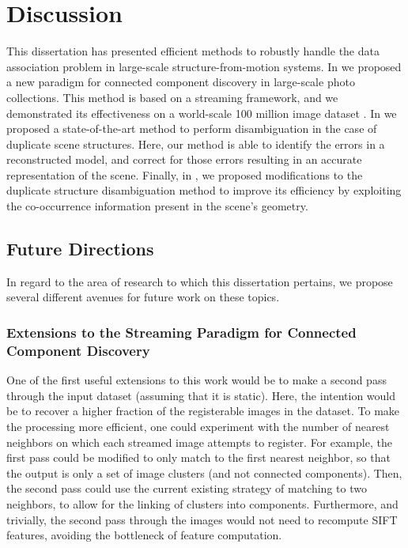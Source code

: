 \chapter{Discussion}
\label{ch:discussion}

This dissertation has presented efficient methods to robustly handle the data association problem in large-scale structure-from-motion systems.
In  we proposed a new paradigm for connected component discovery in large-scale photo collections.
This method is based on a streaming framework, and we demonstrated its effectiveness on a world-scale 100 million image dataset \cite{yahoo_100m, thomee2015_data_challenges}.
In  we proposed a state-of-the-art method to perform disambiguation in the case of duplicate scene structures.
Here, our method is able to identify the errors in a reconstructed model, and correct for those errors resulting in an accurate representation of the scene.
Finally, in , we proposed modifications to the duplicate structure disambiguation method to improve its efficiency by exploiting the co-occurrence information present in the scene's geometry.

\section{Future Directions}

In regard to the area of research to which this dissertation pertains, we propose several different avenues for future work on these topics.

\subsection[Extensions to the Streaming Paradigm for Connected Component Discovery]{Extensions to the Streaming Paradigm for Connected Component Discovery}
\label{sec:streaming_extensions}

One of the first useful extensions to this work would be to make a second pass through the input dataset (assuming that it is static).
Here, the intention would be to recover a higher fraction of the registerable images in the dataset.
To make the processing more efficient, one could experiment with the number of nearest neighbors on which each streamed image attempts to register.
For example, the first pass could be modified to only match to the first nearest neighbor, so that the output is only a set of image clusters (and not connected components).
Then, the second pass could use the current existing strategy of matching to two neighbors, to allow for the linking of clusters into components.
Furthermore, and trivially, the second pass through the images would not need to recompute SIFT features, avoiding the bottleneck of feature computation.

